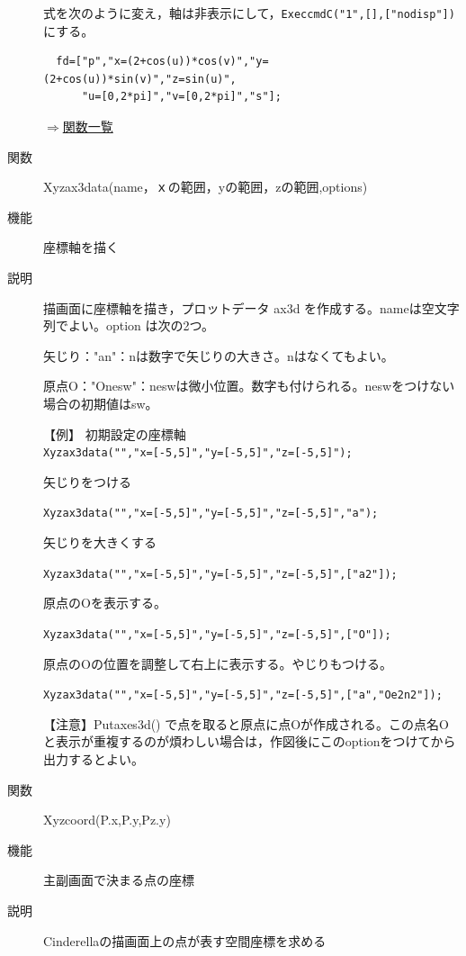 \documentclass[papersize,a4paper,12pt,uplatex]{jsarticle}
\begin{document}
\begin{description}
式を次のように変え，軸は非表示にして，\verb|ExeccmdC("1",[],["nodisp"])| にする。

\begin{verbatim}
  fd=["p","x=(2+cos(u))*cos(v)","y=(2+cos(u))*sin(v)","z=sin(u)",
      "u=[0,2*pi]","v=[0,2*pi]","s"];
\end{verbatim}
\vspace{\baselineskip}
    \begin{center}   \end{center}

\begin{flushright} \hyperlink{functionlist}{$\Rightarrow$関数一覧}\end{flushright}
\vspace{\baselineskip}
\hypertarget{xyzax3data}{}
\item[関数]  Xyzax3data(name，ｘの範囲，yの範囲，zの範囲,options)
\item[機能]  座標軸を描く
\item[説明]  描画面に座標軸を描き，プロットデータ ax3d  を作成する。nameは空文字列でよい。option は次の2つ。

矢じり："an"：nは数字で矢じりの大きさ。nはなくてもよい。

原点O："Onesw"：neswは微小位置。数字も付けられる。neswをつけない場合の初期値はsw。

【例】 初期設定の座標軸\\
\verb|Xyzax3data("","x=[-5,5]","y=[-5,5]","z=[-5,5]");|
        
 矢じりをつける
 
 \verb|Xyzax3data("","x=[-5,5]","y=[-5,5]","z=[-5,5]","a");|
 
 矢じりを大きくする
 
 \verb|Xyzax3data("","x=[-5,5]","y=[-5,5]","z=[-5,5]",["a2"]);|
  
原点のOを表示する。

 \verb|Xyzax3data("","x=[-5,5]","y=[-5,5]","z=[-5,5]",["O"]);|
 
 原点のOの位置を調整して右上に表示する。やじりもつける。
 
 \verb|Xyzax3data("","x=[-5,5]","y=[-5,5]","z=[-5,5]",["a","Oe2n2"]);|
 

【注意】Putaxes3d() で点を取ると原点に点Oが作成される。この点名Oと表示が重複するのが煩わしい場合は，作図後にこのoptionをつけてから出力するとよい。


\vspace{\baselineskip}
\hypertarget{xyzcoord}{}
\item[関数]  Xyzcoord(P.x,P.y,Pz.y)
\item[機能]  主副画面で決まる点の座標
\item[説明]  Cinderellaの描画面上の点が表す空間座標を求める


\end{description}
\end{document}

